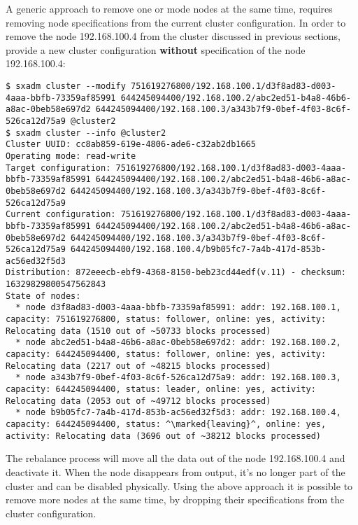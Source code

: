 A generic approach to remove one or mode nodes at the same time, requires
removing node specifications from the current cluster configuration.
In order to remove the node 192.168.100.4 from the cluster discussed in previous
sections, provide a new cluster configuration \textbf{without} specification
of the node 192.168.100.4:
\begin{lstlisting}
$ sxadm cluster --modify 751619276800/192.168.100.1/d3f8ad83-d003-4aaa-bbfb-73359af85991 644245094400/192.168.100.2/abc2ed51-b4a8-46b6-a8ac-0beb58e697d2 644245094400/192.168.100.3/a343b7f9-0bef-4f03-8c6f-526ca12d75a9 @cluster2
$ sxadm cluster --info @cluster2
Cluster UUID: cc8ab859-619e-4806-ade6-c32ab2db1665
Operating mode: read-write
Target configuration: 751619276800/192.168.100.1/d3f8ad83-d003-4aaa-bbfb-73359af85991 644245094400/192.168.100.2/abc2ed51-b4a8-46b6-a8ac-0beb58e697d2 644245094400/192.168.100.3/a343b7f9-0bef-4f03-8c6f-526ca12d75a9 
Current configuration: 751619276800/192.168.100.1/d3f8ad83-d003-4aaa-bbfb-73359af85991 644245094400/192.168.100.2/abc2ed51-b4a8-46b6-a8ac-0beb58e697d2 644245094400/192.168.100.3/a343b7f9-0bef-4f03-8c6f-526ca12d75a9 644245094400/192.168.100.4/b9b05fc7-7a4b-417d-853b-ac56ed32f5d3 
Distribution: 872eeecb-ebf9-4368-8150-beb23cd44edf(v.11) - checksum: 16329829800547562843
State of nodes:
  * node d3f8ad83-d003-4aaa-bbfb-73359af85991: addr: 192.168.100.1, capacity: 751619276800, status: follower, online: yes, activity: Relocating data (1510 out of ~50733 blocks processed)
  * node abc2ed51-b4a8-46b6-a8ac-0beb58e697d2: addr: 192.168.100.2, capacity: 644245094400, status: follower, online: yes, activity: Relocating data (2217 out of ~48215 blocks processed)
  * node a343b7f9-0bef-4f03-8c6f-526ca12d75a9: addr: 192.168.100.3, capacity: 644245094400, status: leader, online: yes, activity: Relocating data (2053 out of ~49712 blocks processed)
  * node b9b05fc7-7a4b-417d-853b-ac56ed32f5d3: addr: 192.168.100.4, capacity: 644245094400, status: ^\marked{leaving}^, online: yes, activity: Relocating data (3696 out of ~38212 blocks processed)
\end{lstlisting}
The rebalance process will move all the data out of the node 192.168.100.4 and
deactivate it. When the node disappears from  output, it's
no longer part of the cluster and can be disabled physically. Using the above
approach it is possible to remove more nodes at the same time, by dropping their
specifications from the cluster configuration.

